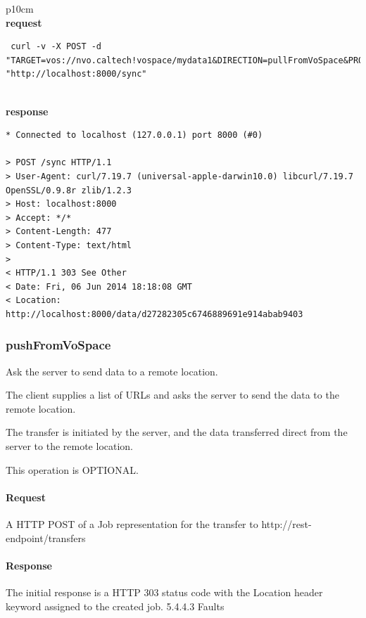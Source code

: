 \documentclass[11pt,a4paper]{ivoa}
\begin{document}
\begin{tabular}{ p{10cm} }
\\
\textbf{request} \\
\begin{lstlisting}
 curl -v -X POST -d "TARGET=vos://nvo.caltech!vospace/mydata1&DIRECTION=pullFromVoSpace&PROTOCOL=ivo://ivoa.net/vospace/core#httpget&REQUEST=redirect" "http://localhost:8000/sync"
 \end{lstlisting} \\
 \textbf{response} \\
 \begin{lstlisting}
* Connected to localhost (127.0.0.1) port 8000 (#0)

> POST /sync HTTP/1.1
> User-Agent: curl/7.19.7 (universal-apple-darwin10.0) libcurl/7.19.7 OpenSSL/0.9.8r zlib/1.2.3
> Host: localhost:8000
> Accept: */*
> Content-Length: 477
> Content-Type: text/html
>
< HTTP/1.1 303 See Other
< Date: Fri, 06 Jun 2014 18:18:08 GMT
< Location: http://localhost:8000/data/d27282305c6746889691e914abab9403
\end{lstlisting}
\end{tabular}

\subsubsection{pushFromVoSpace}
Ask the server to send data to a remote location.

The client supplies a list of URLs and asks the server to send the data to the remote location.

The transfer is initiated by the server, and the data transferred direct from the server to the remote location.

This operation is OPTIONAL.

\paragraph{Request}
A HTTP POST of a Job representation for the transfer to http://rest-endpoint/transfers

\paragraph{Response}
The initial response is a HTTP 303 status code with the Location header keyword assigned to the created job.
5.4.4.3 Faults
\end{document}
